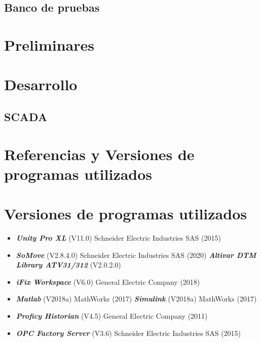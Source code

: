 \documentclass[12pt,a4paper]{article}
\begin{document}
\subsection{Banco de pruebas}

\section{Preliminares}

	
\section{Desarrollo}



\clearpage
\newpage
\subsection{SCADA}



\newpage



\newpage
\section{Referencias y Versiones de programas utilizados}


\printbibliography

\section*{Versiones de programas utilizados}

\begin{itemize}
	\item \textbf{\textit{Unity Pro XL}} (V11.0) Schneider Electric Industries SAS (2015) 
	\item \textbf{\textit{SoMove}} (V2.8.4.0) Schneider Electric Industries SAS (2020)  
	\subitem \textbf{\textit{Altivar DTM Library ATV31/312}} (V2.0.2.0) 
	\item \textbf{\textit{iFix Workspace}} (V6.0) General Electric Company (2018) 
	\item \textbf{\textit{Matlab}} (V2018a) MathWorks (2017)
	\subitem \textbf{\textit{Simulink}}  (V2018a) MathWorks (2017)
	
	\item \textbf{\textit{Proficy Historian}} (V4.5) General Electric Company (2011) 
	\item \textbf{\textit{OPC Factory Server}} (V3.6) Schneider Electric Industries SAS (2015)
	
\end{itemize}
\newpage
\appendix

\appendix


\end{document}
